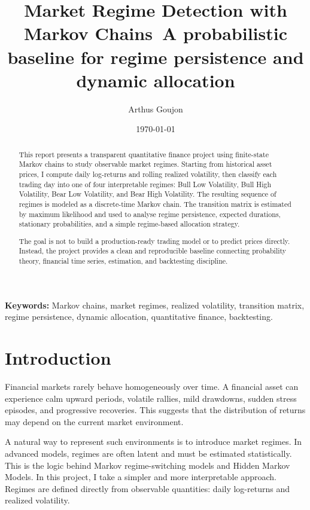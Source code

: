 \documentclass[11pt,a4paper]{article}
\title{\textbf{Market Regime Detection with Markov Chains}\
\large A probabilistic baseline for regime persistence and dynamic allocation}
\author{Arthus Goujon}
\date{\today}
\begin{document}
\maketitle

\begin{abstract}
This report presents a transparent quantitative finance project using finite-state Markov chains to study observable market regimes. Starting from historical asset prices, I compute daily log-returns and rolling realized volatility, then classify each trading day into one of four interpretable regimes: Bull Low Volatility, Bull High Volatility, Bear Low Volatility, and Bear High Volatility. The resulting sequence of regimes is modeled as a discrete-time Markov chain. The transition matrix is estimated by maximum likelihood and used to analyse regime persistence, expected durations, stationary probabilities, and a simple regime-based allocation strategy.

The goal is not to build a production-ready trading model or to predict prices directly. Instead, the project provides a clean and reproducible baseline connecting probability theory, financial time series, estimation, and backtesting discipline.
\end{abstract}

\vspace{0.3cm}

\noindent
\textbf{Keywords:} Markov chains, market regimes, realized volatility, transition matrix, regime persistence, dynamic allocation, quantitative finance, backtesting.

\tableofcontents

\newpage

\section{Introduction}

Financial markets rarely behave homogeneously over time. A financial asset can experience calm upward periods, volatile rallies, mild drawdowns, sudden stress episodes, and progressive recoveries. This suggests that the distribution of returns may depend on the current market environment.

A natural way to represent such environments is to introduce market regimes. In advanced models, regimes are often latent and must be estimated statistically. This is the logic behind Markov regime-switching models and Hidden Markov Models. In this project, I take a simpler and more interpretable approach. Regimes are defined directly from observable quantities: daily log-returns and realized volatility.
\end{document}
